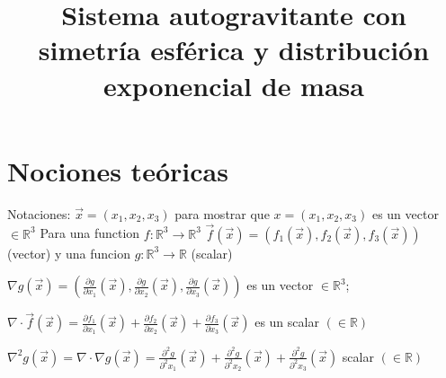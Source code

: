 \documentclass[12pt]{book}
\title{Sistema autogravitante con simetría esférica y distribución exponencial de masa}
\date{}
\begin{document}
\section*{Nociones teóricas}


\begin{footnotesize}
Notaciones: 
$\vec{x} = (x_1, x_2, x_3)$ para mostrar que $x = (x_1, x_2, x_3)$ es un vector $\in \mathbb{R}^3$
Para una function  $f \colon \mathbb{R}^3 \to \mathbb{R}^3$ $\vec{f}(\vec{x}) = (f_1(\vec{x}), f_2(\vec{x}), f_3(\vec{x}) )$ (vector)
y una  funcion $g \colon \mathbb{R}^3 \to \mathbb{R}$ (scalar)
\begin{description}
\item
$\nabla g(\vec{x}) = (\frac{\partial g}{\partial x_1}(\vec{x}), \frac{\partial g}{\partial x_2}(\vec{x}), \frac{\partial g}{\partial x_3}(\vec{x}) )$ es un  vector $\in   \mathbb{R}^3$;
\item
$\nabla  \cdot  \vec{f}(\vec{x}) =  \frac{\partial f_1}{\partial x_1}(\vec{x})+ \frac{\partial f_2}{\partial x_2}(\vec{x})+ \frac{\partial f_3}{\partial x_3}(\vec{x})$ es un scalar $(\in \mathbb{R})$
\item
$\nabla^2 g(\vec{x}) = \nabla  \cdot \nabla g(\vec{x}) = \frac{\partial^2 g}{\partial^2 x_1}(\vec{x})+ \frac{\partial^2 g}{\partial^2 x_2}(\vec{x})+ \frac{\partial^2 g}{\partial^2 x_3}(\vec{x})$ scalar $(\in \mathbb{R})
$
\end{description}
\end{footnotesize}
\end{document}
